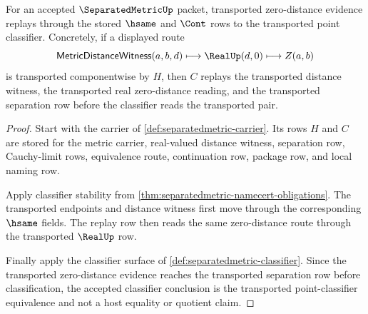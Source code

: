 \begin{theorem}\label{thm:separatedmetric-classifier-stability-row}
For an accepted $\SeparatedMetricUp$ packet, transported zero-distance evidence replays through the stored $\hsame$ and $\Cont$ rows to the transported point classifier. Concretely, if a displayed route
$$
\mathsf{MetricDistanceWitness}(a,b,d) \longmapsto \RealUp(d,0) \longmapsto Z(a,b)
$$
is transported componentwise by $H$, then $C$ replays the transported distance witness, the transported real zero-distance reading, and the transported separation row before the classifier reads the transported pair.
\end{theorem}
\begin{proof}
Start with the carrier of \autoref{def:separatedmetric-carrier}. Its rows $H$ and $C$ are stored for the metric carrier, real-valued distance witness, separation row, Cauchy-limit rows, equivalence route, continuation row, package row, and local naming row.

Apply classifier stability from \autoref{thm:separatedmetric-namecert-obligations}. The transported endpoints and distance witness first move through the corresponding $\hsame$ fields. The replay row then reads the same zero-distance route through the transported $\RealUp$ row.

Finally apply the classifier surface of \autoref{def:separatedmetric-classifier}. Since the transported zero-distance evidence reaches the transported separation row before classification, the accepted classifier conclusion is the transported point-classifier equivalence and not a host equality or quotient claim.
\end{proof}

